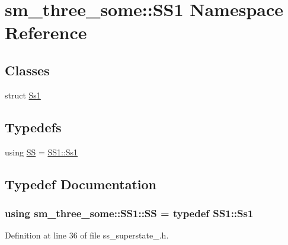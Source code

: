 \hypertarget{namespacesm__three__some_1_1SS1}{}\section{sm\+\_\+three\+\_\+some\+:\+:S\+S1 Namespace Reference}
\label{namespacesm__three__some_1_1SS1}
\subsection*{Classes}
\begin{DoxyCompactItemize}
\item 
struct \hyperlink{structsm__three__some_1_1SS1_1_1Ss1}{Ss1}
\end{DoxyCompactItemize}
\subsection*{Typedefs}
\begin{DoxyCompactItemize}
\item 
using \hyperlink{namespacesm__three__some_1_1SS1_ac4d8073976f20771e5e3e2320b19014f}{SS} = \hyperlink{structsm__three__some_1_1SS1_1_1Ss1}{S\+S1\+::\+Ss1}
\end{DoxyCompactItemize}


\subsection{Typedef Documentation}
\subsubsection[{\texorpdfstring{SS}{SS}}]{\setlength{\rightskip}{0pt plus 5cm}using {\bf sm\+\_\+three\+\_\+some\+::\+S\+S1\+::\+SS} = typedef {\bf S\+S1\+::\+Ss1}}\hypertarget{namespacesm__three__some_1_1SS1_ac4d8073976f20771e5e3e2320b19014f}{}\label{namespacesm__three__some_1_1SS1_ac4d8073976f20771e5e3e2320b19014f}


Definition at line 36 of file ss\+\_\+superstate\+\_.\+h.

